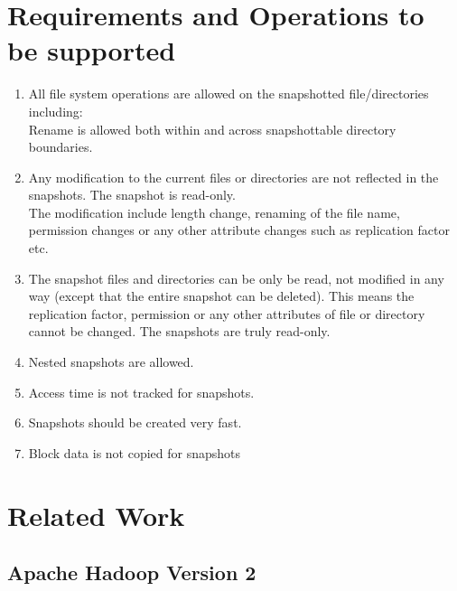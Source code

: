 \section{Requirements and Operations to be supported}
\begin{enumerate}
\item All file system operations are allowed on the snapshotted file/directories including:\\
\hspace{5em} Rename is allowed both within and across snapshottable directory boundaries.

\item Any modification to the current files or directories are not reflected in the snapshots. The
snapshot is read-only.\\
\hspace{5 em} The modification include length change, renaming of the file name, permission changes or any other attribute changes such as replication factor etc.

\item The snapshot files and directories can be only be read, not modified in any way (except that the
entire snapshot can be deleted). This means the replication factor, permission or any other
attributes of file or directory cannot be changed. The snapshots are truly read-only.

\item Nested snapshots are allowed.

\item Access time is not tracked for snapshots.

\item Snapshots should be created very fast.

\item Block data is not copied for snapshots

\end{enumerate}





\section{Related Work}

\subsection{Apache Hadoop Version 2}
\cite{Hadoop2}
